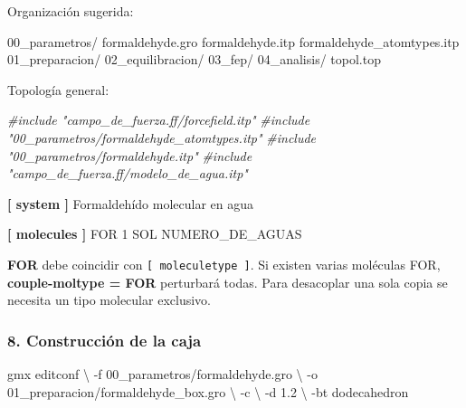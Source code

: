 \documentclass[
  spanish,
  11pt,
  a4paper]{article}
\newenvironment{Shaded}{\begin{snugshade}}{\end{snugshade}}
\newcommand{\AttributeTok}[1]{\textcolor[rgb]{0.13,0.29,0.53}{#1}}
\newcommand{\CommentTok}[1]{\textcolor[rgb]{0.56,0.35,0.01}{\textit{#1}}}
\newcommand{\DataTypeTok}[1]{\textcolor[rgb]{0.13,0.29,0.53}{#1}}
\newcommand{\ExtensionTok}[1]{#1}
\newcommand{\KeywordTok}[1]{\textcolor[rgb]{0.13,0.29,0.53}{\textbf{#1}}}
\newcommand{\NormalTok}[1]{#1}
\begin{document}
Organización sugerida:

\begin{Shaded}
\begin{Highlighting}[]
\NormalTok{00\_parametros/}
\NormalTok{    formaldehyde.gro}
\NormalTok{    formaldehyde.itp}
\NormalTok{    formaldehyde\_atomtypes.itp}
\NormalTok{01\_preparacion/}
\NormalTok{02\_equilibracion/}
\NormalTok{03\_fep/}
\NormalTok{04\_analisis/}
\NormalTok{topol.top}
\end{Highlighting}
\end{Shaded}

Topología general:

\begin{Shaded}
\begin{Highlighting}[]
\CommentTok{\#include "campo\_de\_fuerza.ff/forcefield.itp"}
\CommentTok{\#include "00\_parametros/formaldehyde\_atomtypes.itp"}
\CommentTok{\#include "00\_parametros/formaldehyde.itp"}
\CommentTok{\#include "campo\_de\_fuerza.ff/modelo\_de\_agua.itp"}

\KeywordTok{[ system ]}
\DataTypeTok{Formaldehído molecular en agua}

\KeywordTok{[ molecules ]}
\DataTypeTok{FOR    1}
\DataTypeTok{SOL    NUMERO\_DE\_AGUAS}
\end{Highlighting}
\end{Shaded}

\textbf{FOR} debe coincidir con \texttt{{[}\ moleculetype\ {]}}. Si
existen varias moléculas FOR, \textbf{couple-moltype = FOR} perturbará
todas. Para desacoplar una sola copia se necesita un tipo molecular
exclusivo.

\subsubsection{8. Construcción de la
caja}\label{construcciuxf3n-de-la-caja}

\begin{Shaded}
\begin{Highlighting}[]
\ExtensionTok{gmx}\NormalTok{ editconf }\DataTypeTok{\textbackslash{}}
    \AttributeTok{{-}f}\NormalTok{ 00\_parametros/formaldehyde.gro }\DataTypeTok{\textbackslash{}}
    \AttributeTok{{-}o}\NormalTok{ 01\_preparacion/formaldehyde\_box.gro }\DataTypeTok{\textbackslash{}}
    \AttributeTok{{-}c} \DataTypeTok{\textbackslash{}}
    \AttributeTok{{-}d}\NormalTok{ 1.2 }\DataTypeTok{\textbackslash{}}
    \AttributeTok{{-}bt}\NormalTok{ dodecahedron}
\end{Highlighting}
\end{Shaded}
\end{document}
